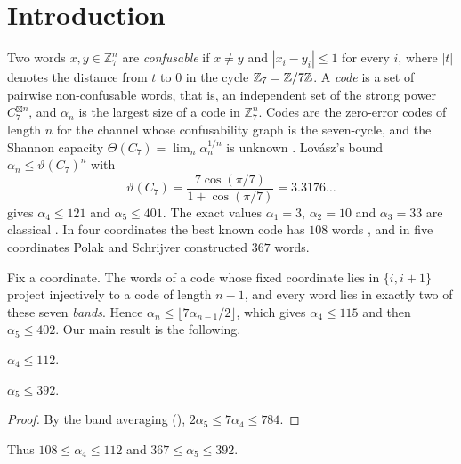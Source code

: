 \documentclass[11pt,colorlinks]{charlie}
\newcommand{\spow}{\boxtimes}
\newcommand{\Zs}{\mathbb{Z}_7}
\begin{document}
\section{Introduction}
Two words $x,y\in\Zs^n$ are \emph{confusable} if $x\ne y$ and $|x_i-y_i|\le1$ for every $i$, where $|t|$ denotes the distance from $t$ to $0$ in the cycle $\Zs=\Z/7\Z$. A \emph{code} is a set of pairwise non-confusable words, that is, an independent set of the strong power $C_7^{\spow n}$, and $\alpha_n$ is the largest size of a code in $\Zs^n$. Codes are the zero-error codes of length $n$ for the channel whose confusability graph is the seven-cycle, and the Shannon capacity $\Theta(C_7)=\lim_n\alpha_n^{1/n}$ is unknown \cite{Lovasz}. Lov\'asz's bound $\alpha_n\le\vartheta(C_7)^n$ with
\[
 \vartheta(C_7)=\frac{7\cos(\pi/7)}{1+\cos(\pi/7)}=3.3176\ldots
\]
gives $\alpha_4\le121$ and $\alpha_5\le401$. The exact values $\alpha_1=3$, $\alpha_2=10$ and $\alpha_3=33$ are classical \cite{BBC}. In four coordinates the best known code has $108$ words \cite{VZ}, and in five coordinates Polak and Schrijver \cite{PS} constructed $367$ words.

Fix a coordinate. The words of a code whose fixed coordinate lies in $\{i,i+1\}$ project injectively to a code of length $n-1$, and every word lies in exactly two of these seven \emph{bands}. Hence $\alpha_n\le\lfloor7\alpha_{n-1}/2\rfloor$, which gives $\alpha_4\le115$ and then $\alpha_5\le402$. Our main result is the following.

\begin{theorem}\label{thm:main}
$\alpha_4\le112$.
\end{theorem}

\begin{corollary}\label{cor:five}
$\alpha_5\le392$.
\end{corollary}

\begin{proof}
By the band averaging (), $2\alpha_5\le7\alpha_4\le784$.
\end{proof}

Thus $108\le\alpha_4\le112$ and $367\le\alpha_5\le392$.
\end{document}
